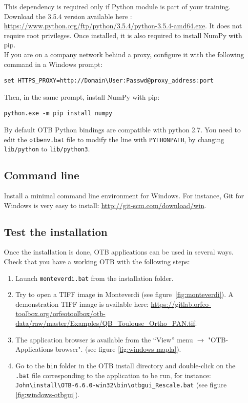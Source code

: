 \documentclass[10pt,a4paper]{article}
\begin{document}
This dependency is required only if Python module is part of your
training. Download the 3.5.4 version available here :
\url{https://www.python.org/ftp/python/3.5.4/python-3.5.4-amd64.exe}. It does
not require root privileges. Once installed, it is also required to install
NumPy with pip.\\

If you are on a company network behind a proxy, configure it with the following
command in a Windows prompt:

\begin{verbatim}
set HTTPS_PROXY=http://Domain\User:Passwd@proxy_address:port
\end{verbatim}

Then, in the same prompt, install NumPy with pip:

\begin{verbatim}
python.exe -m pip install numpy
\end{verbatim}

By default OTB Python bindings are compatible with python 2.7. You need to edit
the \verb?otbenv.bat? file to modify the line with \verb?PYTHONPATH?, by
changing \verb?lib/python? to \verb?lib/python3?.

\subsection{Command line}
Install a minimal command line environment for Windows. For instance, Git for
Windows is very easy to install: \url{http://git-scm.com/download/win}.

\subsection{Test the installation}
Once the installation is done, OTB applications can be used in several ways. Check that you have a working OTB with the following steps:
\begin{enumerate}

\item Launch \texttt{monteverdi.bat} from the installation folder.

\item Try to open a TIFF image in Monteverdi (see
figure~\ref{fig:monteverdi}). A demonstration TIFF image is available here: \url{https://gitlab.orfeo-toolbox.org/orfeotoolbox/otb-data/raw/master/Examples/QB\_Toulouse\_Ortho\_PAN.tif}.

\item The application browser is available from the ``View'' menu 
$\rightarrow$ "OTB-Applications browser".
(see figure \ref{fig:windows-mapla}).

\item Go to the \texttt{bin} folder in the OTB install directory and double-click on the \texttt{.bat} file corresponding to the application to be run, for instance:\\
\texttt{John{\textbackslash}install{\textbackslash}OTB-6.6.0-win32{\textbackslash}bin{\textbackslash}otbgui\_Rescale.bat}
(see figure \ref{fig:windows-otbgui}).

\end{enumerate}
\end{document}
